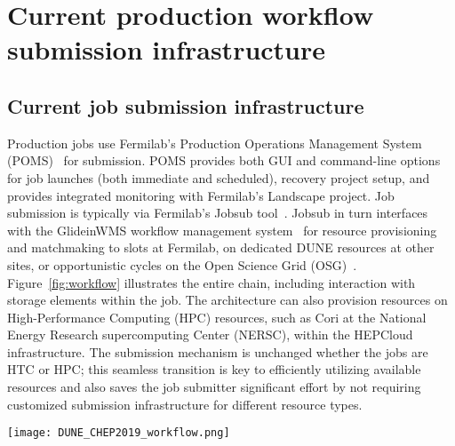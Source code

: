 \documentclass{webofc}
\begin{document}
\section{Current production workflow submission infrastructure}
\label{sec:current}

\subsection{Current job submission infrastructure}
\label{subsec:jobsub}

Production jobs use Fermilab's Production Operations Management System (POMS)~\cite{FIFE18,poms-chep19} for submission. POMS provides both GUI and command-line options for job launches (both immediate and scheduled), recovery project setup, and provides integrated monitoring with Fermilab's Landscape project. Job submission is typically via Fermilab's Jobsub tool~\cite{fife-jobsub}. Jobsub in
turn interfaces with the GlideinWMS workflow management system~\cite{glideinwms} for resource provisioning and matchmaking to slots at Fermilab, on dedicated DUNE resources at other sites, or opportunistic cycles on the Open Science Grid (OSG)~\cite{osg}. Figure~\ref{fig:workflow} illustrates the entire chain, including interaction with storage elements within the job.
The architecture can also provision resources on High-Performance Computing (HPC) resources, such as Cori at the National Energy Research supercomputing Center (NERSC), within the HEPCloud~\cite{hepcloud,hepcloud2} infrastructure. The submission mechanism is unchanged whether the jobs are HTC or HPC; this seamless transition is key to efficiently utilizing available resources and also saves the job submitter significant effort by not requiring customized submission infrastructure for different resource types.

\begin{figure*}[htb]
\centering
\texttt{[image: DUNE\_CHEP2019\_workflow.png]}
\caption{Overview of the current DUNE Production workflow setup used also by the ProtoDUNE detectors for data reconstruction and simulation. Production group members interact with POMS to submit jobs, which uses the Jobsub tool to submit jobs to a HTCondor schedd. GlideinWMS provisions worker node resources and jobs match to the available worker node slots. DUNE jobs interact with storage elements both at Fermilab and other sites both for input copy (or streaming for most production workflows) and output copyback.}
\label{fig:workflow}       %
\end{figure*}
\end{document}

